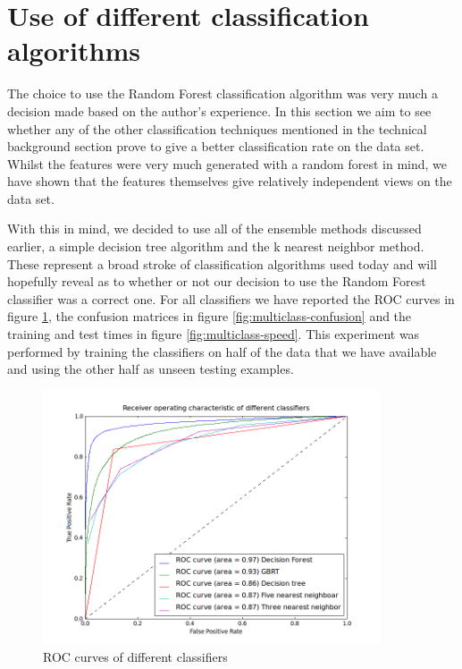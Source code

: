 \documentclass[ %
                    author={Sam Phippen},
                supervisor={Dr. Rafal Bogacz},
                     title={Real time voice activity detectors in noisy personal computing environments},
                  subtitle={},
                    degree={MEng},
                      year={2012} ]{thesis}
\begin{document}
\section{Use of different classification algorithms}

The choice to use the Random Forest classification algorithm was very much a
decision made based on the author's experience. In this section we aim to see
whether any of the other classification techniques mentioned in the technical
background section prove to give a better classification rate on the data set.
Whilst the features were very much generated with a random forest in mind, we
have shown that the features themselves give relatively independent views on
the data set.

With this in mind, we decided to use all of the ensemble methods discussed
earlier, a simple decision tree algorithm and the k nearest neighbor method.
These represent a broad stroke of classification algorithms used today and will
hopefully reveal as to whether or not our decision to use the Random Forest
classifier was a correct one. For all classifiers we have reported the ROC
curves in figure \ref{fig:multiclass-roc}, the confusion matrices in
figure \ref{fig:multiclass-confusion} and the training and test times in
figure \ref{fig:multiclass-speed}. This experiment was performed by training the
classifiers on half of the data that we have available and using the other half
as unseen testing examples.

\begin{figure}
    \includegraphics[width=10cm]{roc_different.png}
    \caption{ROC curves of different classifiers}
    \label{fig:multiclass-roc}
\end{figure}
\end{document}
